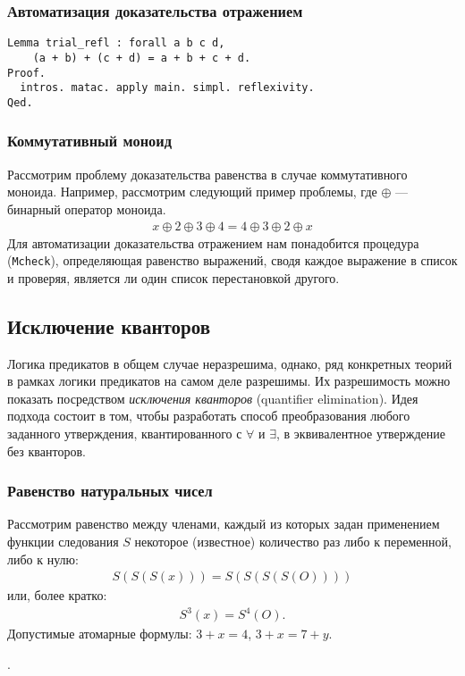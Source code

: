 \documentclass{beamer}
\begin{document}
\begin{frame}[fragile]
  \frametitle{Автоматизация доказательства отражением}
\begin{verbatim}
Lemma trial_refl : forall a b c d,
    (a + b) + (c + d) = a + b + c + d.
Proof.
  intros. matac. apply main. simpl. reflexivity.
Qed.
\end{verbatim}
\end{frame}

\begin{frame}
  \frametitle{Коммутативный моноид}
  Рассмотрим проблему доказательства равенства в случае коммутативного моноида\footnotemark. Например, рассмотрим следующий пример проблемы, где $\oplus$ --- бинарный оператор моноида.
  \begin{align*}
    x \oplus 2 \oplus 3 \oplus 4 = 4 \oplus 3 \oplus 2 \oplus x
  \end{align*}
  Для автоматизации доказательства отражением нам понадобится процедура (\texttt{Mcheck}), определяющая равенство выражений, сводя каждое выражение в список и проверяя, является ли один список перестановкой другого.

\end{frame}

\begin{frame}
  \section{Исключение кванторов}
  Логика предикатов в общем случае неразрешима, однако, ряд конкретных теорий в рамках логики предикатов на самом деле разрешимы\footnotemark. Их разрешимость можно показать посредством \textit{исключения кванторов} (quantifier elimination). Идея подхода состоит в том, чтобы разработать способ преобразования любого заданного утверждения, квантированного с $\forall$ и $\exists$, в эквивалентное утверждение без кванторов.

\end{frame}

\begin{frame}
  \frametitle{Равенство натуральных чисел}
  Рассмотрим равенство между членами, каждый из которых задан применением функции следования $S$ некоторое (известное) количество раз либо к переменной, либо к нулю\footnotemark:
  \begin{align*}
    S(S(S(x))) = S(S(S(S(O))))
  \end{align*}
  или, более кратко:
  \begin{align*}
    S^3(x) = S^4(O).
  \end{align*}
  Допустимые атомарные формулы: $3 + x = 4$, $3 + x = 7 + y$.

  .
\end{frame}
\end{document}
